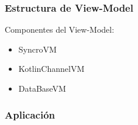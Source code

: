 \documentclass[14pt]{beamer}
\begin{document}
\begin{frame}
\frametitle{Estructura de View-Model}
Componentes del View-Model:
\begin{itemize}
\item SyncroVM
\item KotlinChannelVM
\item DataBaseVM


\end{itemize}


\end{frame}


\begin{frame}
\frametitle{Aplicación}
\begin{columns}
\begin{column}{0.25\textwidth}
\begin{center}


\end{center}
\end{column}
\end{columns}
\end{frame}
\end{document}
